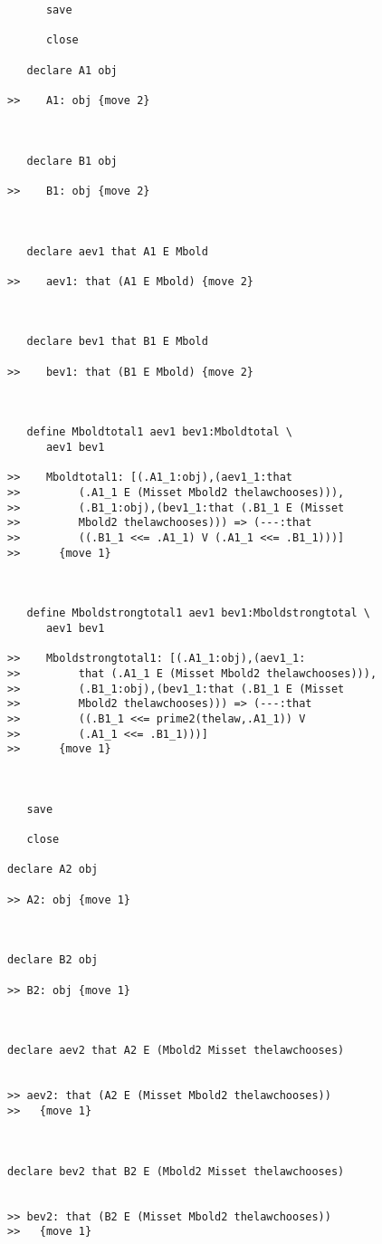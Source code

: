 \documentclass[12pt]{article}
\begin{document}
\begin{verbatim}
      save

      close

   declare A1 obj

>>    A1: obj {move 2}



   declare B1 obj

>>    B1: obj {move 2}



   declare aev1 that A1 E Mbold

>>    aev1: that (A1 E Mbold) {move 2}



   declare bev1 that B1 E Mbold

>>    bev1: that (B1 E Mbold) {move 2}



   define Mboldtotal1 aev1 bev1:Mboldtotal \
      aev1 bev1

>>    Mboldtotal1: [(.A1_1:obj),(aev1_1:that
>>         (.A1_1 E (Misset Mbold2 thelawchooses))),
>>         (.B1_1:obj),(bev1_1:that (.B1_1 E (Misset
>>         Mbold2 thelawchooses))) => (---:that
>>         ((.B1_1 <<= .A1_1) V (.A1_1 <<= .B1_1)))]
>>      {move 1}



   define Mboldstrongtotal1 aev1 bev1:Mboldstrongtotal \
      aev1 bev1

>>    Mboldstrongtotal1: [(.A1_1:obj),(aev1_1:
>>         that (.A1_1 E (Misset Mbold2 thelawchooses))),
>>         (.B1_1:obj),(bev1_1:that (.B1_1 E (Misset
>>         Mbold2 thelawchooses))) => (---:that
>>         ((.B1_1 <<= prime2(thelaw,.A1_1)) V
>>         (.A1_1 <<= .B1_1)))]
>>      {move 1}



   save

   close

declare A2 obj

>> A2: obj {move 1}



declare B2 obj

>> B2: obj {move 1}



declare aev2 that A2 E (Mbold2 Misset thelawchooses)


>> aev2: that (A2 E (Misset Mbold2 thelawchooses))
>>   {move 1}



declare bev2 that B2 E (Mbold2 Misset thelawchooses)


>> bev2: that (B2 E (Misset Mbold2 thelawchooses))
>>   {move 1}




\end{verbatim}
\end{document}
